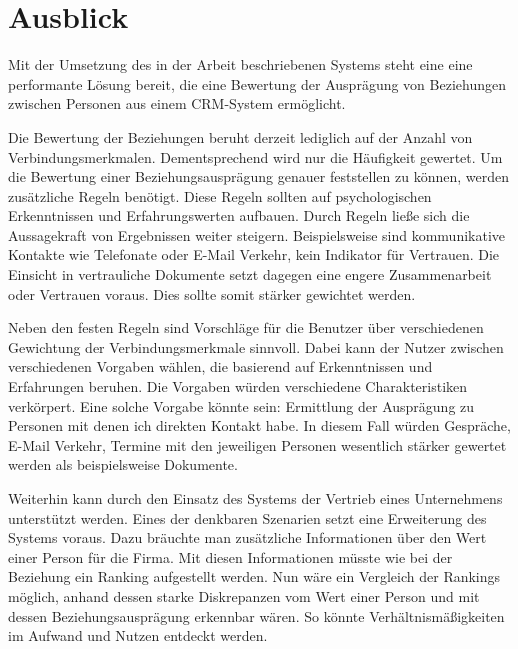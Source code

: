 \section{Ausblick}
\label{ch:Ergebnis:sec:Ausblick}

Mit der Umsetzung des in der Arbeit beschriebenen Systems steht eine eine performante Lösung bereit, die eine Bewertung der Ausprägung von Beziehungen zwischen Personen aus einem CRM-System ermöglicht.

Die Bewertung der Beziehungen beruht derzeit lediglich auf der Anzahl von Verbindungsmerkmalen. Dementsprechend wird nur die Häufigkeit gewertet. Um die Bewertung einer Beziehungsausprägung genauer feststellen zu können, werden zusätzliche Regeln benötigt. Diese Regeln sollten auf psychologischen Erkenntnissen und Erfahrungswerten aufbauen. Durch Regeln ließe sich die Aussagekraft von Ergebnissen weiter steigern. Beispielsweise sind kommunikative Kontakte wie Telefonate oder E-Mail Verkehr, kein Indikator für Vertrauen. Die Einsicht in vertrauliche Dokumente setzt dagegen eine engere Zusammenarbeit oder Vertrauen voraus. Dies sollte somit stärker gewichtet werden. 

Neben den festen Regeln sind Vorschläge für die Benutzer über verschiedenen Gewichtung der Verbindungsmerkmale sinnvoll. Dabei kann der Nutzer zwischen verschiedenen Vorgaben wählen, die basierend auf Erkenntnissen und Erfahrungen beruhen. Die Vorgaben würden verschiedene Charakteristiken verkörpert. Eine solche Vorgabe könnte sein: Ermittlung der Ausprägung zu Personen mit denen ich direkten Kontakt habe. In diesem Fall würden Gespräche, E-Mail Verkehr, Termine mit den jeweiligen Personen wesentlich stärker gewertet werden als beispielsweise Dokumente.

Weiterhin kann durch den Einsatz des Systems der Vertrieb eines Unternehmens unterstützt werden. Eines der denkbaren Szenarien setzt eine Erweiterung des Systems voraus. Dazu bräuchte man zusätzliche Informationen über den Wert einer Person für die Firma. Mit diesen Informationen müsste wie bei der Beziehung ein Ranking aufgestellt werden. Nun wäre ein Vergleich der Rankings möglich, anhand dessen starke Diskrepanzen vom Wert einer Person und mit dessen Beziehungsausprägung erkennbar wären. So könnte Verhältnismäßigkeiten im Aufwand und Nutzen entdeckt werden.


